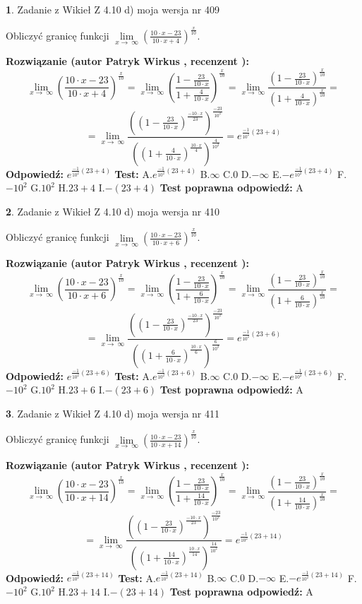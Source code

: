 \documentclass[12pt, a4paper]{article}
\theoremstyle{definition} %
\newtheorem{zad}{}
\newcommand{\zadStart}[1]{\begin{zad}#1\newline}
\newcommand{\zadStop}{\end{zad}}
\newcommand{\rozwStart}[2]{\noindent \textbf{Rozwiązanie (autor #1 , recenzent #2): }\newline}
\newcommand{\rozwStop}{\newline}
\newcommand{\odpStart}{\noindent \textbf{Odpowiedź:}\newline}
\newcommand{\odpStop}{\newline}
\newcommand{\testStart}{\noindent \textbf{Test:}\newline}
\newcommand{\testStop}{\newline}
\newcommand{\kluczStart}{\noindent \textbf{Test poprawna odpowiedź:}\newline}
\newcommand{\kluczStop}{\newline}
\begin{document}
\zadStart{Zadanie z Wikieł Z 4.10 d) moja wersja nr 409}


Obliczyć granicę funkcji  $\lim\limits_{x\to\ \infty}(\frac{10\cdot x-23}{10\cdot x+4})^{\frac{x}{10}}$.
\zadStop
\rozwStart{Patryk Wirkus}{}
$$\lim\limits_{x\to\ \infty}(\frac{10\cdot x-23}{10\cdot x+4})^{\frac{x}{10}} = \lim\limits_{x\to\ \infty}(\frac{1-\frac{23}{10\cdot x}}{1+\frac{4}{10\cdot x}})^{\frac{x}{10}}=\lim\limits_{x\to\ \infty}\frac{(1-\frac{23}{10\cdot x})^{\frac{x}{10}}}{(1+\frac{4}{10\cdot x})^{\frac{x}{10}}}=$$
$$=\lim\limits_{x\to\ \infty}\frac{((1-\frac{23}{10\cdot x})^{\frac{-10\cdot x}{23}})^{\frac{-23}{10^{2}}}}{((1+\frac{4}{10\cdot x})^{\frac{10\cdot x}{4}})^{\frac{4}{10^{2}}}}=e^{\frac{-1}{10^{2}}(23+4)}$$
\rozwStop
\odpStart
$e^{\frac{-1}{10^{2}}(23+4)}$
\odpStop
\testStart
A.$e^{\frac{-1}{10^{2}}(23+4)}$ B.$\infty$ C.$0$ D.$-\infty$ E.$-e^{\frac{-1}{10^{2}}(23+4)}$
F.$-10^{2}$ G.$10^{2}$
H.$23+4$
I.$-(23+4)$
\testStop
\kluczStart
A
\kluczStop



\zadStart{Zadanie z Wikieł Z 4.10 d) moja wersja nr 410}


Obliczyć granicę funkcji  $\lim\limits_{x\to\ \infty}(\frac{10\cdot x-23}{10\cdot x+6})^{\frac{x}{10}}$.
\zadStop
\rozwStart{Patryk Wirkus}{}
$$\lim\limits_{x\to\ \infty}(\frac{10\cdot x-23}{10\cdot x+6})^{\frac{x}{10}} = \lim\limits_{x\to\ \infty}(\frac{1-\frac{23}{10\cdot x}}{1+\frac{6}{10\cdot x}})^{\frac{x}{10}}=\lim\limits_{x\to\ \infty}\frac{(1-\frac{23}{10\cdot x})^{\frac{x}{10}}}{(1+\frac{6}{10\cdot x})^{\frac{x}{10}}}=$$
$$=\lim\limits_{x\to\ \infty}\frac{((1-\frac{23}{10\cdot x})^{\frac{-10\cdot x}{23}})^{\frac{-23}{10^{2}}}}{((1+\frac{6}{10\cdot x})^{\frac{10\cdot x}{6}})^{\frac{6}{10^{2}}}}=e^{\frac{-1}{10^{2}}(23+6)}$$
\rozwStop
\odpStart
$e^{\frac{-1}{10^{2}}(23+6)}$
\odpStop
\testStart
A.$e^{\frac{-1}{10^{2}}(23+6)}$ B.$\infty$ C.$0$ D.$-\infty$ E.$-e^{\frac{-1}{10^{2}}(23+6)}$
F.$-10^{2}$ G.$10^{2}$
H.$23+6$
I.$-(23+6)$
\testStop
\kluczStart
A
\kluczStop



\zadStart{Zadanie z Wikieł Z 4.10 d) moja wersja nr 411}


Obliczyć granicę funkcji  $\lim\limits_{x\to\ \infty}(\frac{10\cdot x-23}{10\cdot x+14})^{\frac{x}{10}}$.
\zadStop
\rozwStart{Patryk Wirkus}{}
$$\lim\limits_{x\to\ \infty}(\frac{10\cdot x-23}{10\cdot x+14})^{\frac{x}{10}} = \lim\limits_{x\to\ \infty}(\frac{1-\frac{23}{10\cdot x}}{1+\frac{14}{10\cdot x}})^{\frac{x}{10}}=\lim\limits_{x\to\ \infty}\frac{(1-\frac{23}{10\cdot x})^{\frac{x}{10}}}{(1+\frac{14}{10\cdot x})^{\frac{x}{10}}}=$$
$$=\lim\limits_{x\to\ \infty}\frac{((1-\frac{23}{10\cdot x})^{\frac{-10\cdot x}{23}})^{\frac{-23}{10^{2}}}}{((1+\frac{14}{10\cdot x})^{\frac{10\cdot x}{14}})^{\frac{14}{10^{2}}}}=e^{\frac{-1}{10^{2}}(23+14)}$$
\rozwStop
\odpStart
$e^{\frac{-1}{10^{2}}(23+14)}$
\odpStop
\testStart
A.$e^{\frac{-1}{10^{2}}(23+14)}$ B.$\infty$ C.$0$ D.$-\infty$ E.$-e^{\frac{-1}{10^{2}}(23+14)}$
F.$-10^{2}$ G.$10^{2}$
H.$23+14$
I.$-(23+14)$
\testStop
\kluczStart
A
\kluczStop
\end{document}
